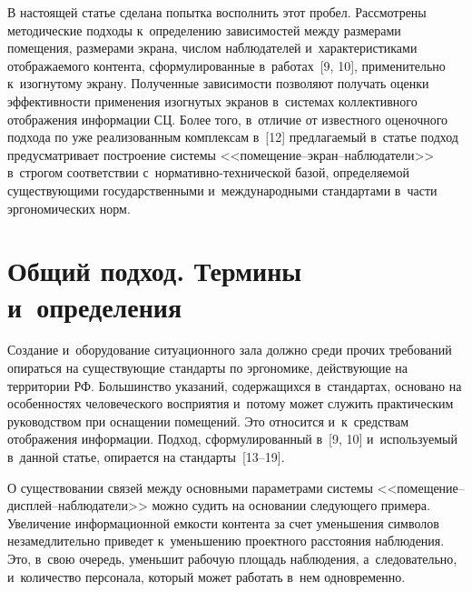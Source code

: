\begin{multicols}{2}
     В настоящей статье сделана попытка восполнить этот пробел.
Рассмотрены методические подходы к~определению зависимостей между
размерами помещения, разме\-рами экрана, числом наблюда\-телей
и~характеристиками отображаемого контента, сформулированные
в~работах~[9, 10], применительно к~изогнутому экрану.
Полученные зависимости позволяют получать оценки эффективности
применения изогнутых экранов в~сис\-те\-мах коллективного отображения
информации СЦ. Более того, в~отличие от известного
оценочного подхода по уже реализованным комплексам в~[12] предлагаемый
в~статье подход предусматривает \mbox{построение} сис\-те\-мы
     <<по\-ме\-ще\-ние--экран--наблю\-да\-те\-ли>> в~строгом соответствии
с~нор\-ма\-тив\-но-тех\-ни\-че\-ской базой, определяемой существующими
государственными и~международными стандартами в~части эргономических
норм.

\section{Общий подход. Термины и~определения}

	Создание и~оборудование ситуационного зала должно среди прочих
требований опираться на существующие стандарты по эргономике,
действующие на территории РФ. Большинство указаний, содержащихся
в~стандартах, основано на особенностях человеческого восприятия и~потому
может служить практическим руководством при оснащении помещений. Это
относится и~к~средствам отображения информации. Подход,
сформулированный в~[9, 10] и~используемый в~данной статье, опирается на
стандарты~[13--19].

    О существовании связей между основными параметрами системы
    <<по\-ме\-ще\-ние--дис\-плей--на\-блю\-да\-те\-ли>> можно судить на
основании сле\-ду\-юще\-го примера. Увеличение информационной емкости
контента за счет уменьшения символов незамедлительно приведет
к~уменьшению проектного расстояния наблюдения. Это, в~свою очередь,
уменьшит рабочую площадь наблюдения, а~следовательно, и~количество
персонала, который может работать в~нем одновременно.


\end{multicols}
